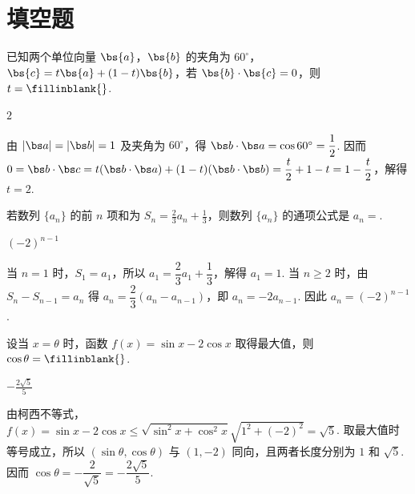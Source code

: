 \section{填空题}

\begin{problem}
已知两个单位向量 \(\bs{a}\)，\(\bs{b}\) 的夹角为 \(60^{\circ}\)，\(\bs{c} = t\bs{a} + (1 - t)\bs{b}\)，若 \(\bs{b} \cdot \bs{c} = 0\)，则 \(t =\fillinblank{}\).
\end{problem}

\begin{answer}
\(2\)
\end{answer}

\begin{solution}
由 \(\lvert\bs a\rvert=\lvert\bs b\rvert=1\) 及夹角为 \(60^\circ\)，得 \(\bs b\cdot\bs a=\cos60^\circ=\dfrac12\). 因而
\(0=\bs b\cdot\bs c=t(\bs b\cdot\bs a)+(1-t)(\bs b\cdot\bs b)=\dfrac t2+1-t=1-\dfrac t2\)，解得 \(t=2\).
\end{solution}

\begin{problem}
若数列 \(\{a_{n}\}\) 的前 \(n\) 项和为 \(S_{n}=\frac{2}{3}a_{n}+\frac{1}{3}\)，则数列 \(\{a_{n}\}\) 的通项公式是 \(a_{n}=\)\fillinblank{}.
\end{problem}

\begin{answer}
\((-2)^{n-1}\)
\end{answer}

\begin{solution}
当 \(n=1\) 时，\(S_1=a_1\)，所以 \(a_1=\dfrac23a_1+\dfrac13\)，解得 \(a_1=1\). 当 \(n\geqslant2\) 时，由 \(S_n-S_{n-1}=a_n\) 得
\(a_n=\dfrac23(a_n-a_{n-1})\)，即 \(a_n=-2a_{n-1}\). 因此 \(a_n=(-2)^{n-1}\).
\end{solution}

\begin{problem}
设当 \(x = \theta\) 时，函数 \(f(x) = \sin x - 2\cos x\) 取得最大值，则 \(\cos \theta =\fillinblank{}\).
\end{problem}

\begin{answer}
\(-\frac{2\sqrt{5}}{5}\)
\end{answer}

\begin{solution}
由柯西不等式，\(f(x)=\sin x-2\cos x\leqslant\sqrt{\sin^2x+\cos^2x}\sqrt{1^2+(-2)^2}=\sqrt5\). 取最大值时等号成立，所以 \((\sin\theta,\cos\theta)\) 与 \((1,-2)\) 同向，且两者长度分别为 \(1\) 和 \(\sqrt5\). 因而 \(\cos\theta=-\dfrac2{\sqrt5}=-\dfrac{2\sqrt5}{5}\).
\end{solution}

